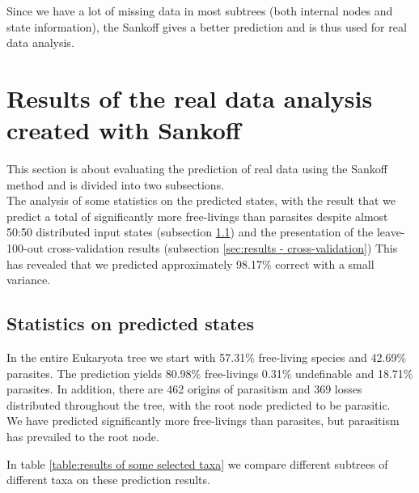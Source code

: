     Since we have a lot of missing data in most subtrees (both internal nodes and state information), 
      the Sankoff gives a better prediction and is thus used for real data analysis.

  \section{Results of the real data analysis created with Sankoff}
    This section is about evaluating the prediction of real data using the Sankoff method and is 
      divided into two subsections. \\
    The analysis of some statistics on the predicted states, with the result that we predict a total 
      of significantly more free-livings than parasites despite almost 50:50 distributed input states 
      (subsection \ref{subsec:results - statistics on predicted states}) and the presentation of the 
      leave-100-out cross-validation results (subsection \ref{sec:results - cross-validation}) This 
      has revealed that we predicted approximately 98.17\% correct with a small variance.

    \subsection{Statistics on predicted states} \label{subsec:results - statistics on predicted states}
      In the entire Eukaryota tree we start with 57.31\% free-living species and 42.69\% parasites. The 
        prediction yields 80.98\% free-livings 0.31\% undefinable and 18.71\% parasites. In addition, 
        there are 462 origins of parasitism and 369 losses distributed throughout the tree, with the 
        root node predicted to be parasitic. \\
      We have predicted significantly more free-livings than parasites, but parasitism has prevailed to 
        the root node.
      
      In table \ref{table:results of some selected taxa} we compare different subtrees of different taxa 
        on these prediction results.
      
